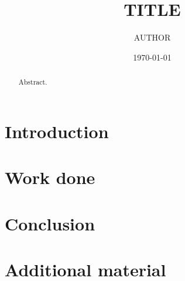 \documentclass[11pt]{report}
\title{{{TITLE}}}
\author{{{AUTHOR}}}
\date{\today}
\theoremstyle{plain}
\theoremstyle{definition}
\theoremstyle{remark}
\begin{document}
\maketitle
\begin{abstract}
Abstract.
\end{abstract}
\tableofcontents
\chapter{Introduction}
\chapter{Work done}
\chapter{Conclusion}
\appendix
\chapter{Additional material}


\end{document}
